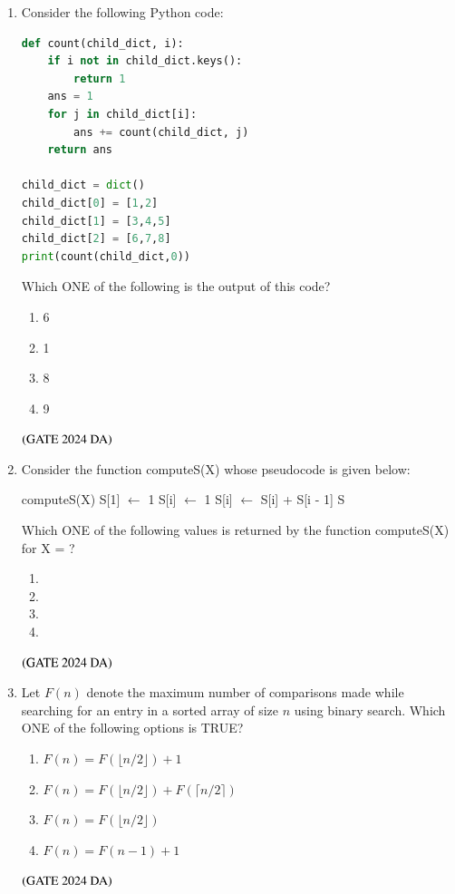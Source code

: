 \documentclass[journal,12pt,onecolumn]{IEEEtran}
\theoremstyle{remark}
\begin{document}
\begin{enumerate}[resume]
\item Consider the following Python code:
\begin{lstlisting}[language=Python]
def count(child_dict, i):
    if i not in child_dict.keys():
        return 1
    ans = 1
    for j in child_dict[i]:
        ans += count(child_dict, j)
    return ans

child_dict = dict()
child_dict[0] = [1,2]
child_dict[1] = [3,4,5]
child_dict[2] = [6,7,8]
print(count(child_dict,0))
\end{lstlisting}
Which ONE of the following is the output of this code?
\begin{multicols}{4}
\begin{enumerate}
    \item 6
    \item 1
    \item 8
    \item 9
\end{enumerate}
\end{multicols}
\hfill $\left(\text{GATE 2024 DA}\right)$


\item Consider the function computeS(X) whose pseudocode is given below:
\begin{algorithmic}
\STATE computeS(X)
\STATE S[1] $\leftarrow$ 1
\STATE S[i] $\leftarrow$ 1
\STATE S[i] $\leftarrow$ S[i] + S[i - 1]
\ENDIF
\ENDFOR
\RETURN S
\end{algorithmic}
Which ONE of the following values is returned by the function computeS(X) for X = ?
\begin{multicols}{4}
\begin{enumerate}
\item {}
\item {}
\item {}
\item {}
\end{enumerate}
\end{multicols}
\hfill $\left(\text{GATE 2024 DA}\right)$


\item Let $F(n)$ denote the maximum number of comparisons made while searching for an entry in a sorted array of size $n$ using binary search. Which ONE of the following options is TRUE?
\begin{enumerate}
\item $F(n) = F(\lfloor n/2 \rfloor) + 1$
\item $F(n) = F(\lfloor n/2 \rfloor) + F(\lceil n/2 \rceil)$
\item $F(n) = F(\lfloor n/2 \rfloor)$
\item $F(n) = F(n - 1) + 1$
\end{enumerate}
\hfill $\left(\text{GATE 2024 DA}\right)$



\end{enumerate}
\end{document}
